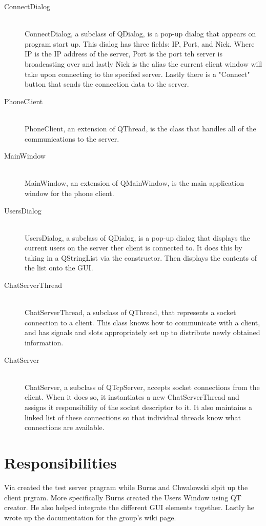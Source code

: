 \documentclass[12pt]{article}
\begin{document}
\begin{description}
\item[ConnectDialog] \hfill \\
ConnectDialog, a subclass of QDialog, is a pop-up dialog that appears on program start up. This dialog has three fields: IP, Port, and Nick. Where IP is the IP address of the server, Port is the port teh server is broadcasting over and lastly Nick is the alias the current client window will take upon connecting to the specifed server. Lastly there is a "Connect" button that sends the connection data to the server.

\item[PhoneClient] \hfill \\
PhoneClient, an extension of QThread, is the class that handles all of the
communications to the server. 

\item[MainWindow] \hfill \\
MainWindow, an extension of QMainWindow, is the main application window for the phone client.

\item[UsersDialog] \hfill \\
UsersDialog, a subclass of QDialog, is a pop-up dialog that displays the current users on the server ther client is connected to. It does this by taking in a QStringList via the constructor. Then displays the contents of the list onto the GUI.

\item[ChatServerThread] \hfill \\
ChatServerThread, a subclass of QThread, that represents a socket connection to
a client.  This class knows how to communicate with a client, and has signals
and slots appropriately set up to distribute newly obtained information.

\item[ChatServer] \hfill \\
ChatServer, a subclass of QTcpServer, accepts socket connections from the
client.  When it does so, it instantiates a new ChatServerThread and assigns it
responsibility of the socket descriptor to it.  It also maintains a linked list
of these connections so that individual threads know what connections are
available.

\end{description}

\section{Responsibilities}
Via created the test server pragram while Burns and Chwalowski slpit up the client prgram. More specifically Burns created the Users Window using QT creator. He also helped integrate the different GUI elements together. Lastly he wrote up the documentation for the group's wiki page. 
\end{document}
